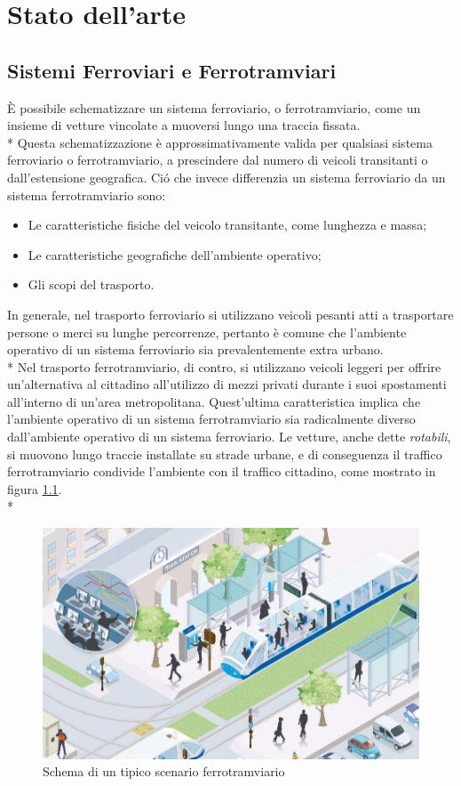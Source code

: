 \chapter{Stato dell'arte}
\section{Sistemi Ferroviari e Ferrotramviari}
\`E possibile schematizzare un sistema ferroviario, o ferrotramviario, come un insieme di vetture vincolate a muoversi lungo una traccia fissata.\\*
Questa schematizzazione \`e approssimativamente valida per qualsiasi sistema ferroviario o ferrotramviario, a prescindere dal numero di veicoli transitanti o dall'estensione geografica. Ci\'o che invece differenzia un sistema ferroviario da un sistema ferrotramviario sono:
\begin{itemize}
		\item Le caratteristiche fisiche del veicolo transitante, come lunghezza e massa;
		\item Le caratteristiche geografiche dell'ambiente operativo;
		\item Gli scopi del trasporto.
\end{itemize}
In generale, nel trasporto ferroviario si utilizzano veicoli pesanti atti a trasportare persone o merci su lunghe percorrenze, pertanto \`e comune che l'ambiente operativo di un sistema ferroviario sia prevalentemente extra urbano.\\*
Nel trasporto ferrotramviario, di contro, si utilizzano veicoli leggeri per offrire un'alternativa al cittadino all'utilizzo di mezzi privati durante i suoi spostamenti all'interno di un'area metropolitana. Quest'ultima caratteristica implica che l'ambiente operativo di un sistema ferrotramviario sia radicalmente diverso dall'ambiente operativo di un sistema ferroviario. Le vetture, anche dette \emph{rotabili}, si muovono lungo traccie installate su strade urbane, e di conseguenza il traffico ferrotramviario condivide l'ambiente con il traffico cittadino, come mostrato in figura \ref{fig:tramschema}.\\*
\begin{figure}[h]
		\centering
		\includegraphics[width=0.7\linewidth]{img/twschema}
		\caption{Schema di un tipico scenario ferrotramviario}
		\label{fig:tramschema}
\end{figure}
